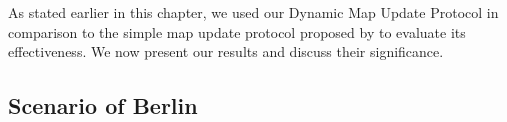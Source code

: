 As stated earlier in this chapter, we used our Dynamic Map Update Protocol in comparison to the simple map update protocol proposed by \citet{bastiaensen2003actmap} to evaluate its effectiveness. We now present our results and discuss their significance.
\subsection{Scenario of Berlin}


